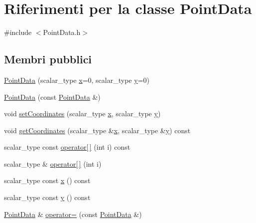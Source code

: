 \hypertarget{classPointData}{\section{Riferimenti per la classe Point\-Data}
\label{classPointData}
}


{\ttfamily \#include $<$Point\-Data.\-h$>$}

\subsection*{Membri pubblici}
\begin{DoxyCompactItemize}
\item 
\hyperlink{classPointData_a533a569f3a96d571b47cb7417c3b8b09}{Point\-Data} (scalar\-\_\-type \hyperlink{classPointData_a5accef5ea9e813dd4517eb050f276ccf}{x}=0, scalar\-\_\-type \hyperlink{classPointData_a90dbf32a9579cb1cde67458d4ad38209}{y}=0)
\item 
\hyperlink{classPointData_a110696aaa98e78579880de5b83a93c9e}{Point\-Data} (const \hyperlink{classPointData}{Point\-Data} \&)
\item 
void \hyperlink{classPointData_ab78a09aa5b435105ea30c3b3d327bb82}{set\-Coordinates} (scalar\-\_\-type \hyperlink{classPointData_a5accef5ea9e813dd4517eb050f276ccf}{x}, scalar\-\_\-type \hyperlink{classPointData_a90dbf32a9579cb1cde67458d4ad38209}{y})
\item 
void \hyperlink{classPointData_a9cbe93016a271a90a23c44fe4830cc68}{get\-Coordinates} (scalar\-\_\-type \&\hyperlink{classPointData_a5accef5ea9e813dd4517eb050f276ccf}{x}, scalar\-\_\-type \&\hyperlink{classPointData_a90dbf32a9579cb1cde67458d4ad38209}{y}) const 
\item 
scalar\-\_\-type const \hyperlink{classPointData_a0dc393437f21f7d81f3befc323ef5ff2}{operator\mbox{[}$\,$\mbox{]}} (int i) const 
\item 
scalar\-\_\-type \& \hyperlink{classPointData_a1a78e025d26ab02f1217095cf8114d73}{operator\mbox{[}$\,$\mbox{]}} (int i)
\item 
scalar\-\_\-type const \hyperlink{classPointData_a5accef5ea9e813dd4517eb050f276ccf}{x} () const 
\item 
scalar\-\_\-type const \hyperlink{classPointData_a90dbf32a9579cb1cde67458d4ad38209}{y} () const 
\item 
\hyperlink{classPointData}{Point\-Data} \& \hyperlink{classPointData_aee654398556253e58e2eac86dacd6bc8}{operator=} (const \hyperlink{classPointData}{Point\-Data} \&)
\item 

\end{DoxyCompactItemize}
